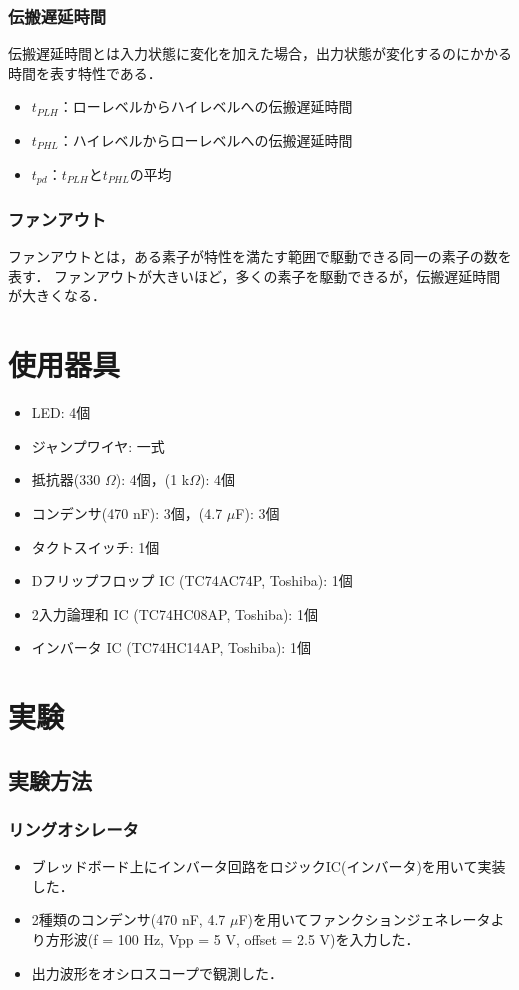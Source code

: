 \documentclass{ltjsarticle}
\begin{document}
\subsubsection{伝搬遅延時間}
伝搬遅延時間とは入力状態に変化を加えた場合，出力状態が変化するのにかかる時間を表す特性である．
\begin{itemize}
  \item ${t_{PLH}}$：ローレベルからハイレベルへの伝搬遅延時間
  \item ${t_{PHL}}$：ハイレベルからローレベルへの伝搬遅延時間
  \item ${t_{pd}}$：${t_{PLH}}$と${t_{PHL}}$の平均
\end{itemize}

\subsubsection{ファンアウト}
ファンアウトとは，ある素子が特性を満たす範囲で駆動できる同一の素子の数を表す．
ファンアウトが大きいほど，多くの素子を駆動できるが，伝搬遅延時間が大きくなる．


\section{使用器具}
\begin{itemize}
  \item LED: 4個
  \item ジャンプワイヤ: 一式
  \item 抵抗器(330 $\Omega$): 4個，(1 k$\Omega$): 4個
  \item コンデンサ(470 nF): 3個，(4.7 $\mu$F): 3個
  \item タクトスイッチ: 1個
  \item Dフリップフロップ IC (TC74AC74P, Toshiba): 1個
  \item 2入力論理和 IC (TC74HC08AP, Toshiba): 1個
  \item インバータ IC (TC74HC14AP, Toshiba): 1個
\end{itemize}

\section{実験}
\subsection{実験方法}
\subsubsection{リングオシレータ}
\begin{itemize}
  \item ブレッドボード上にインバータ回路をロジックIC(インバータ)を用いて実装した．
  \item 2種類のコンデンサ(470 nF, 4.7 $\mu$F)を用いてファンクションジェネレータより方形波(f = 100 Hz, Vpp = 5 V, offset = 2.5 V)を入力した．
  \item 出力波形をオシロスコープで観測した．
\end{itemize}
\end{document}
